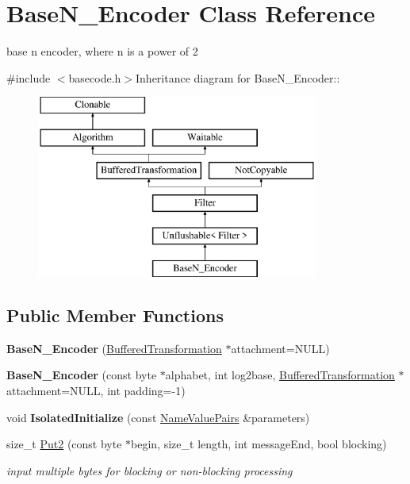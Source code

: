 \hypertarget{class_base_n___encoder}{
\section{BaseN\_\-Encoder Class Reference}
\label{class_base_n___encoder}
}


base n encoder, where n is a power of 2  


{\ttfamily \#include $<$basecode.h$>$}Inheritance diagram for BaseN\_\-Encoder::\begin{figure}[H]
\begin{center}
\leavevmode
\includegraphics[height=6cm]{class_base_n___encoder}
\end{center}
\end{figure}
\subsection*{Public Member Functions}
\begin{DoxyCompactItemize}
\item 
\hypertarget{class_base_n___encoder_ad81ec041d8edf8d2b7d4bae384d68bb0}{
{\bfseries BaseN\_\-Encoder} (\hyperlink{class_buffered_transformation}{BufferedTransformation} $\ast$attachment=NULL)}
\label{class_base_n___encoder_ad81ec041d8edf8d2b7d4bae384d68bb0}

\item 
\hypertarget{class_base_n___encoder_a398208a2300b000ee5f4f1a0957118bb}{
{\bfseries BaseN\_\-Encoder} (const byte $\ast$alphabet, int log2base, \hyperlink{class_buffered_transformation}{BufferedTransformation} $\ast$attachment=NULL, int padding=-\/1)}
\label{class_base_n___encoder_a398208a2300b000ee5f4f1a0957118bb}

\item 
\hypertarget{class_base_n___encoder_a3489c960fafc6ae65a8749133646901b}{
void {\bfseries IsolatedInitialize} (const \hyperlink{class_name_value_pairs}{NameValuePairs} \&parameters)}
\label{class_base_n___encoder_a3489c960fafc6ae65a8749133646901b}

\item 
size\_\-t \hyperlink{class_base_n___encoder_adb9ab1b4d48de6c26b04d4691be2f0f0}{Put2} (const byte $\ast$begin, size\_\-t length, int messageEnd, bool blocking)
\begin{DoxyCompactList}\small\item\em input multiple bytes for blocking or non-\/blocking processing \item\end{DoxyCompactList}\end{DoxyCompactItemize}


